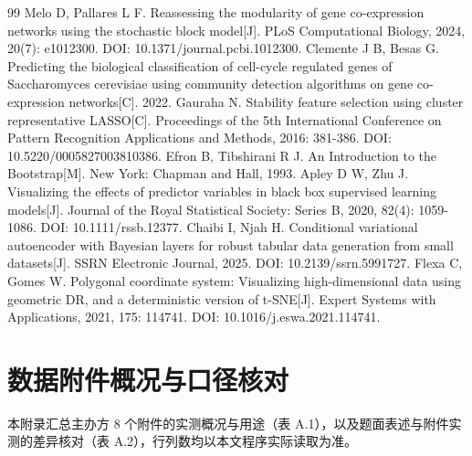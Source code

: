 \documentclass[zihao=-4,a4paper,UTF8,fontset=none]{ctexart}
\providecommand{\heiti}{}
\renewcommand{\heiti}{\CJKfamily{zhhei}}
\renewcommand{\thetable}{\arabic{table}}
\begin{document}
\begin{thebibliography}{99}
 Melo D, Pallares L F. Reassessing the modularity of gene co-expression networks using the stochastic block model[J]. PLoS Computational Biology, 2024, 20(7): e1012300. DOI: 10.1371/journal.pcbi.1012300.
 Clemente J B, Besas G. Predicting the biological classification of cell-cycle regulated genes of Saccharomyces cerevisiae using community detection algorithms on gene co-expression networks[C]. 2022.
 Gauraha N. Stability feature selection using cluster representative LASSO[C]. Proceedings of the 5th International Conference on Pattern Recognition Applications and Methods, 2016: 381-386. DOI: 10.5220/0005827003810386.
 Efron B, Tibshirani R J. An Introduction to the Bootstrap[M]. New York: Chapman and Hall, 1993.
 Apley D W, Zhu J. Visualizing the effects of predictor variables in black box supervised learning models[J]. Journal of the Royal Statistical Society: Series B, 2020, 82(4): 1059-1086. DOI: 10.1111/rssb.12377.
 Chaibi I, Njah H. Conditional variational autoencoder with Bayesian layers for robust tabular data generation from small datasets[J]. SSRN Electronic Journal, 2025. DOI: 10.2139/ssrn.5991727.
 Flexa C, Gomes W. Polygonal coordinate system: Visualizing high-dimensional data using geometric DR, and a deterministic version of t-SNE[J]. Expert Systems with Applications, 2021, 175: 114741. DOI: 10.1016/j.eswa.2021.114741.
\endgroup
\end{thebibliography}

\clearpage
\appendix
\titleformat{\section}{\centering\heiti\zihao{3}\bfseries}{附录~\thesection}{0.8em}{}
\titleformat{\subsection}{\heiti\zihao{4}\bfseries}{\thesubsection}{0.8em}{}

\section{数据附件概况与口径核对}
\setcounter{table}{0}
\renewcommand{\thetable}{\Alph{section}.\arabic{table}}

本附录汇总主办方 8 个附件的实测概况与用途（表 A.1），以及题面表述与附件实测的差异核对（表 A.2），行列数均以本文程序实际读取为准。
\end{document}
